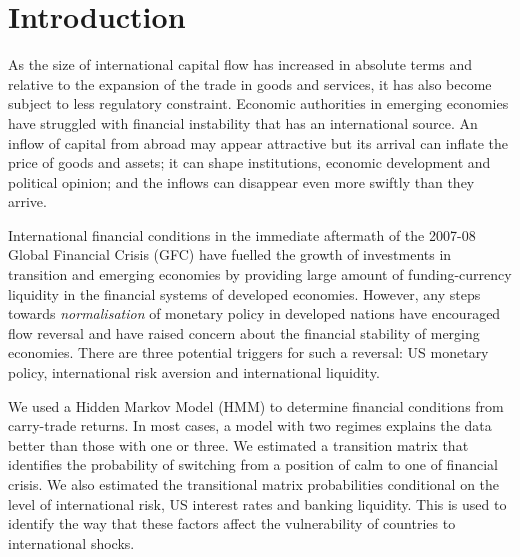\documentclass[12pt, a4paper, oneside]{article}\usepackage[]{graphicx}\usepackage[]{color}
\begin{document}
\section{Introduction}
As the size of international capital flow has increased in absolute terms and relative to the expansion of the trade in goods and services, it has also become subject to less regulatory constraint. Economic authorities in emerging economies have struggled with financial instability that has an international source.  An inflow of capital from abroad may appear attractive but its arrival can inflate the price of goods and assets; it can shape institutions, economic development and political opinion; and the inflows can disappear even more swiftly than they arrive.  %


International financial conditions in the immediate aftermath of the 2007-08 Global Financial Crisis (GFC) have fuelled the growth of investments in transition and emerging economies by providing large amount of funding-currency liquidity in the financial systems of developed economies.  However, any steps towards \emph{normalisation} of monetary policy in developed nations have encouraged flow reversal and have raised concern about the financial stability of merging economies.  There are three  potential triggers for such a reversal:  US monetary policy, international risk aversion and international liquidity. 

We used a Hidden Markov Model (HMM) to determine financial conditions from carry-trade returns. In most cases, a model with two regimes explains the data better than those with one or three.  We estimated a transition matrix that identifies the probability of switching from a position of calm to one of financial crisis. We also estimated the transitional matrix probabilities conditional on the level of international risk, US interest rates and banking liquidity.  This is used to identify the way that these factors affect the vulnerability of countries to international shocks.    %
  
\end{document}
